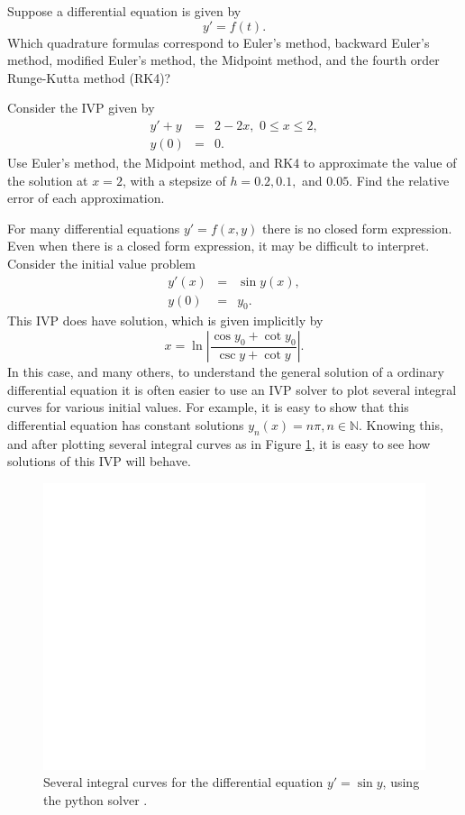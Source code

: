 \begin{problem}
Suppose a differential equation is given by
\[ y' = f(t).\]
Which quadrature formulas correspond to Euler's method, backward Euler's method, modified Euler's method, the Midpoint method, and the fourth order Runge-Kutta method (RK4)? 
\end{problem}


\begin{problem}
Consider the IVP given by 
\begin{eqnarray*}
y' + y &=& 2-2x,\,\, 0 \leq x \leq 2, \\
y(0) &=& 0.
\end{eqnarray*}
Use Euler's method, the Midpoint method, and RK4 to approximate the value of the solution at $x = 2$, with a stepsize of $h = 0.2, 0.1,$ and $0.05 $. Find the relative error of each approximation.
\end{problem}

For many differential equations $y' = f(x,y)$ there is no closed form expression. Even when there is a closed form expression, it may be difficult to interpret. Consider the initial value problem 
\begin{eqnarray*}
y'(x) &=& \sin y(x), \\
y(0) &=& y_0.
\end{eqnarray*}
This IVP does have solution, which is given implicitly by 
\[x = \ln \left|\frac{\cos y_0 + \cot y_0}{\csc y + \cot y} \right|.\]
In this case, and many others, to understand the general solution of a ordinary differential equation it is often easier to use an IVP solver to plot several integral curves for various initial values. For example, it is easy to show that this differential equation has constant solutions $y_n(x) = n \pi, n \in \mathbb{N}$. Knowing this, and after plotting several integral curves as in Figure \ref{ivp:int_curves}, it is easy to see how solutions of this IVP will behave.


\begin{figure}
\centering
\includegraphics[width=\textwidth]{Fig4.pdf}
\caption{Several integral curves for the differential equation $y' =\sin y$, using the python solver . }
\label{ivp:int_curves}
\end{figure}

